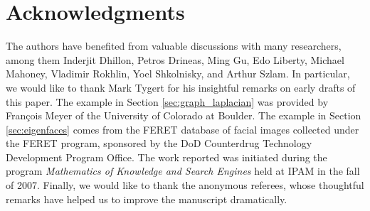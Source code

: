 \documentclass[final]{siamltex}
\newcommand{\pgnotate}[1]{{\color{blue}[#1]}}
\begin{document}
\section*{Acknowledgments}
The authors have benefited from valuable discussions with many
researchers, among them Inderjit Dhillon, Petros Drineas, Ming Gu,
Edo Liberty, Michael Mahoney, Vladimir Rokhlin,
Yoel Shkolnisky, and Arthur Szlam.
In particular, we would like to thank Mark Tygert for his insightful
remarks on early drafts of this paper.
The example in Section \ref{sec:graph_laplacian} was provided by
Fran{\c{c}}ois Meyer of the University of Colorado at Boulder.
%
The example in Section \ref{sec:eigenfaces} comes from the FERET
database of facial images collected under the FERET program,
sponsored by the DoD Counterdrug Technology Development Program
Office.
%
The work reported was initiated during the program
\textit{Mathematics of Knowledge and Search Engines}
held at IPAM in the fall of 2007.
Finally, we would like to thank the anonymous referees, whose
thoughtful remarks have helped us to improve the manuscript
dramatically.


\lsp
\end{document}
